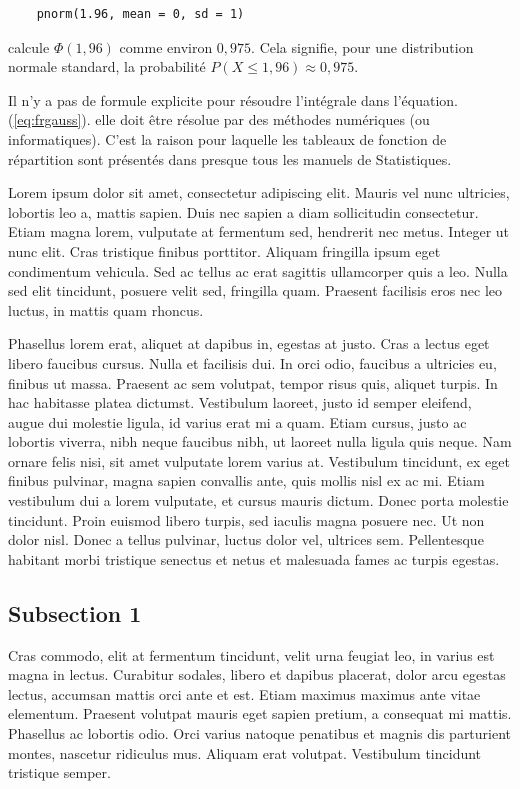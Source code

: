 {\begin{verbatim}
    pnorm(1.96, mean = 0, sd = 1)
\end{verbatim}
calcule $\Phi(1,96)$ comme environ $0,975$. Cela signifie, pour une distribution normale standard, la
probabilité $P(X ≤ 1,96) \approx 0,975$.

\begin{remark}
    Il n'y a pas de formule explicite pour résoudre l'intégrale dans l'équation. (\ref{eq:frgauss}).
    elle doit être résolue par des méthodes numériques (ou informatiques). C'est la raison pour laquelle les
    tableaux de fonction de répartition sont présentés dans presque tous les manuels de Statistiques.
\end{remark}


Lorem ipsum dolor sit amet, consectetur adipiscing elit. Mauris vel nunc ultricies, lobortis leo a, mattis sapien. Duis nec sapien a diam sollicitudin consectetur. Etiam magna lorem, vulputate at fermentum sed, hendrerit nec metus. Integer ut nunc elit. Cras tristique finibus porttitor. Aliquam fringilla ipsum eget condimentum vehicula. Sed ac tellus ac erat sagittis ullamcorper quis a leo. Nulla sed elit tincidunt, posuere velit sed, fringilla quam. Praesent facilisis eros nec leo luctus, in mattis quam rhoncus.

Phasellus lorem erat, aliquet at dapibus in, egestas at justo. Cras a lectus eget libero faucibus cursus. Nulla et facilisis dui. In orci odio, faucibus a ultricies eu, finibus ut massa. Praesent ac sem volutpat, tempor risus quis, aliquet turpis. In hac habitasse platea dictumst. Vestibulum laoreet, justo id semper eleifend, augue dui molestie ligula, id varius erat mi a quam. Etiam cursus, justo ac lobortis viverra, nibh neque faucibus nibh, ut laoreet nulla ligula quis neque. Nam ornare felis nisi, sit amet vulputate lorem varius at. Vestibulum tincidunt, ex eget finibus pulvinar, magna sapien convallis ante, quis mollis nisl ex ac mi. Etiam vestibulum dui a lorem vulputate, et cursus mauris dictum. Donec porta molestie tincidunt. Proin euismod libero turpis, sed iaculis magna posuere nec. Ut non dolor nisl. Donec a tellus pulvinar, luctus dolor vel, ultrices sem. Pellentesque habitant morbi tristique senectus et netus et malesuada fames ac turpis egestas.

\subsection{Subsection 1}

Cras commodo, elit at fermentum tincidunt, velit urna feugiat leo, in varius est magna in lectus. Curabitur sodales, libero et dapibus placerat, dolor arcu egestas lectus, accumsan mattis orci ante et est. Etiam maximus maximus ante vitae elementum. Praesent volutpat mauris eget sapien pretium, a consequat mi mattis. Phasellus ac lobortis odio. Orci varius natoque penatibus et magnis dis parturient montes, nascetur ridiculus mus. Aliquam erat volutpat. Vestibulum tincidunt tristique semper.

}
